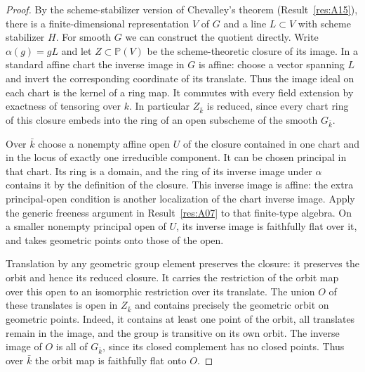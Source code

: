 \documentclass[11pt,a4paper,openany,oneside]{book}
\theoremstyle{resultstyle}
\theoremstyle{definition}
\numberwithin{equation}{chapter}
\begin{document}
\begin{proof}
By the scheme-stabilizer version of Chevalley's theorem (Result~\ref{res:A15}), there is a finite-dimensional representation \(V\) of \(G\) and a line \(L\subset V\) with scheme stabilizer \(H\). For smooth \(G\) we can construct the quotient directly. Write
\(\alpha(g)=gL\) and let \(Z\subset\mathbb P(V)\) be the
scheme-theoretic closure of its image. In a standard affine chart
the inverse image in \(G\) is affine: choose a vector spanning \(L\)
and invert the corresponding coordinate of its translate.
Thus the image ideal on each chart is the kernel of a ring map.
It commutes with every field extension by exactness of tensoring
over \(k\). In particular \(Z_{\bar k}\) is reduced, since every
chart ring of this closure embeds into the ring of an open
subscheme of the smooth \(G_{\bar k}\).

Over \(\bar k\) choose a nonempty affine open \(U\) of the closure
contained in one chart and in the locus of exactly one irreducible
component. It can be chosen principal in that chart. Its ring is a
domain, and the ring of its inverse image under \(\alpha\) contains
it by the definition of the closure. This inverse image is affine:
the extra principal-open condition is another localization of the
chart inverse image. Apply the generic freeness argument in
Result~\ref{res:A07} to that finite-type algebra. On a smaller
nonempty principal open of \(U\), its inverse image is faithfully
flat over it, and takes geometric points onto those of the open.

Translation by any geometric group element preserves the closure:
it preserves the orbit and hence its reduced closure. It carries
the restriction of the orbit map over this open to an isomorphic
restriction over its translate. The union \(O\) of these translates
is open in \(Z_{\bar k}\) and contains precisely the geometric orbit
on geometric points. Indeed, it contains at least one point of
the orbit, all translates remain in the image, and the group is
transitive on its own orbit. The inverse image of \(O\) is all of
\(G_{\bar k}\), since its closed complement has no closed points.
Thus over \(\bar k\) the orbit map is faithfully flat onto \(O\).


\end{proof}
\end{document}

